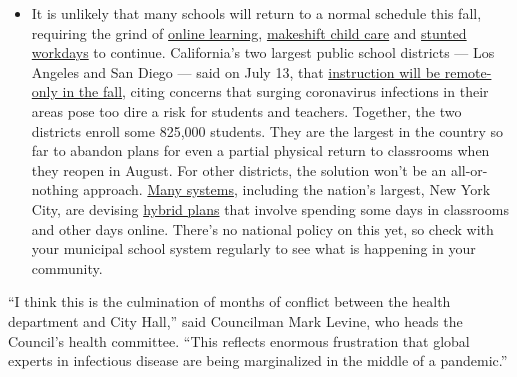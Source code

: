 \begin{itemize}
  \begin{itemize}
  \tightlist
  \item
    It is unlikely that many schools will return to a normal schedule
    this fall, requiring the grind of
    \href{https://www.nytimes.com/2020/06/05/us/coronavirus-education-lost-learning.html?action=click\&pgtype=Article\&state=default\&region=MAIN_CONTENT_3\&context=storylines_faq}{online
    learning},
    \href{https://www.nytimes.com/2020/05/29/us/coronavirus-child-care-centers.html?action=click\&pgtype=Article\&state=default\&region=MAIN_CONTENT_3\&context=storylines_faq}{makeshift
    child care} and
    \href{https://www.nytimes.com/2020/06/03/business/economy/coronavirus-working-women.html?action=click\&pgtype=Article\&state=default\&region=MAIN_CONTENT_3\&context=storylines_faq}{stunted
    workdays} to continue. California's two largest public school
    districts --- Los Angeles and San Diego --- said on July 13, that
    \href{https://www.nytimes.com/2020/07/13/us/lausd-san-diego-school-reopening.html?action=click\&pgtype=Article\&state=default\&region=MAIN_CONTENT_3\&context=storylines_faq}{instruction
    will be remote-only in the fall}, citing concerns that surging
    coronavirus infections in their areas pose too dire a risk for
    students and teachers. Together, the two districts enroll some
    825,000 students. They are the largest in the country so far to
    abandon plans for even a partial physical return to classrooms when
    they reopen in August. For other districts, the solution won't be an
    all-or-nothing approach.
    \href{https://bioethics.jhu.edu/research-and-outreach/projects/eschool-initiative/school-policy-tracker/}{Many
    systems}, including the nation's largest, New York City, are
    devising
    \href{https://www.nytimes.com/2020/06/26/us/coronavirus-schools-reopen-fall.html?action=click\&pgtype=Article\&state=default\&region=MAIN_CONTENT_3\&context=storylines_faq}{hybrid
    plans} that involve spending some days in classrooms and other days
    online. There's no national policy on this yet, so check with your
    municipal school system regularly to see what is happening in your
    community.
  \end{itemize}
\end{itemize}

``I think this is the culmination of months of conflict between the
health department and City Hall,'' said Councilman Mark Levine, who
heads the Council's health committee. ``This reflects enormous
frustration that global experts in infectious disease are being
marginalized in the middle of a pandemic.''

